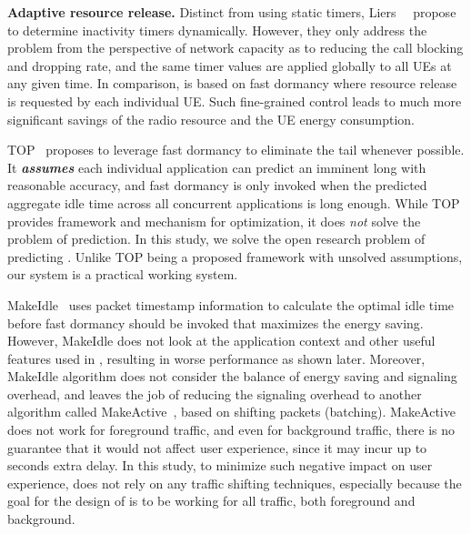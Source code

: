 \textbf{Adaptive resource release.}
Distinct from using static timers, Liers~\etal~\cite{Liers:DynamicTimeout:PIMRC2005} propose to determine inactivity timers dynamically. %
However, they only address the problem from the perspective of network capacity as to reducing the call blocking and dropping rate, and the same timer values are applied globally to all UEs at any given time. In comparison, \NAME is based on fast dormancy where resource release is requested by each individual UE. Such fine-grained control leads to much more significant savings of the radio resource and the UE energy consumption.


TOP~\cite{qian10_icnp} proposes to leverage fast dormancy to eliminate the tail whenever possible. It {\em \bf assumes} each individual application can predict an imminent long \IBT with reasonable accuracy, and fast dormancy is only invoked when the predicted aggregate idle time across all concurrent applications is long enough. While TOP provides framework and mechanism for optimization, it does {\em not} solve the problem of prediction. In this study, we solve the open research problem of predicting \IBTS. Unlike TOP being a proposed framework with unsolved assumptions, our system \NAME is a practical working system.

MakeIdle~\cite{makeidle} uses packet timestamp information to calculate the optimal idle time before fast dormancy should be invoked that maximizes the energy saving. However, MakeIdle does not look at the application context and other useful features used in \NAME, resulting in worse performance as shown later. Moreover, MakeIdle algorithm does not consider the balance of energy saving and signaling overhead, and leaves the job of reducing the signaling overhead to another algorithm called MakeActive~\cite{makeidle}, based on shifting packets (batching). MakeActive does not work for foreground traffic, and even for background traffic, there is no guarantee that it would not affect user experience, since it may incur up to seconds extra delay. In this study, to minimize such negative impact on user experience, \NAME does not rely on any traffic shifting techniques, especially because the goal for the design of \NAME is to be working for all traffic, both foreground and background.

